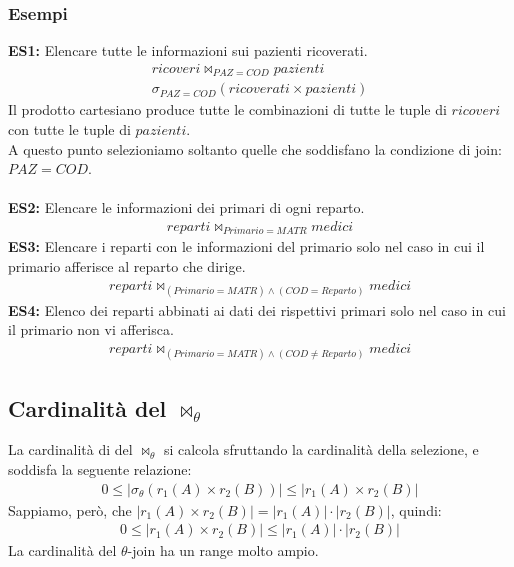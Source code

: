 \subsubsection{Esempi}
\textbf{ES1:} Elencare tutte le informazioni sui pazienti ricoverati.
    \begin{equation}\begin{aligned}
        ricoveri \bowtie_{PAZ = COD} pazienti\\
        \sigma_{PAZ = COD} (ricoverati \times pazienti)
    \end{aligned}\end{equation}
Il prodotto cartesiano produce tutte le combinazioni di tutte le tuple di $ricoveri$ con tutte le tuple di $pazienti$.\\
A questo punto selezioniamo soltanto quelle che soddisfano la condizione di join: $PAZ = COD$.\\\\
\textbf{ES2:} Elencare le informazioni dei primari di ogni reparto.
    \begin{equation}\begin{aligned}
        reparti \bowtie_{Primario = MATR} medici
    \end{aligned}\end{equation}
\textbf{ES3:} Elencare i reparti con le informazioni del primario solo nel caso in cui il primario afferisce al reparto che dirige.
    \begin{equation}\begin{aligned}
        reparti 
        \bowtie_{(Primario = MATR) \wedge (COD = Reparto)} 
        medici
    \end{aligned}\end{equation}
\textbf{ES4:} Elenco dei reparti abbinati ai dati dei rispettivi primari solo nel caso in cui il primario non vi afferisca.
    \begin{equation}\begin{aligned}
        reparti 
        \bowtie_{(Primario = MATR) \wedge (COD \neq Reparto)} 
        medici
    \end{aligned}\end{equation}
    
\subsection{Cardinalità del $\bowtie_{\theta}$}
La cardinalità di del $\bowtie_{\theta}$ si calcola sfruttando la cardinalità della selezione, e soddisfa la seguente relazione:
    \begin{equation}\begin{aligned}
        0 \leq |\sigma_{\theta}(r_1(A) \times r_2(B))| \leq |r_1(A) \times r_2(B)|
    \end{aligned}\end{equation}
Sappiamo, però, che $|r_1(A) \times r_2(B)| = |r_1(A)| \cdot |r_2(B)|$, quindi:
    \begin{equation}\begin{aligned}
        0 \leq |r_1(A) \times r_2(B)| \leq |r_1(A)| \cdot |r_2(B)|
    \end{aligned}\end{equation}
La cardinalità del $\theta$-join ha un range molto ampio.

